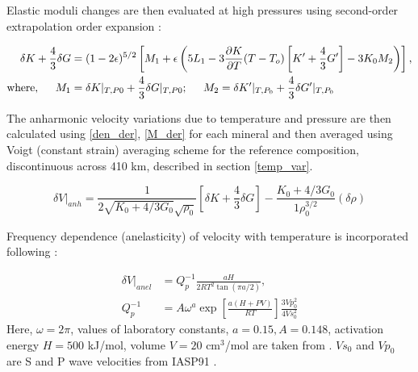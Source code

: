 \documentclass[draft,linenumbers]{agujournal2018}
\begin{document}
Elastic moduli changes are then evaluated at high pressures using second-order extrapolation order expansion \citep{duffy1989seismic}:

\begin{align} \label{M_der}
    \delta K + \frac{4}{3} \delta G &= ( 1 - 2 \epsilon)^{5/2} \left[ M_1 + \epsilon \left( 5 L_1 - 3 \frac{\partial K}{\partial T }  ( T - T_o ) \left[ K' + \frac{4}{3} G' \right] - 3K_0 M_2 \right)  \right], \\ 
    \text{where}, \hspace{0.5cm}
    M_1 &= \delta K\vert_{T, P0} + \frac{4}{3}\delta G\vert_{T, P0} ; \hspace{0.5cm}
    M_2 = \delta K'\vert_{T, P_0} + \frac{4}{3}\delta G'\vert_{T, P_0} \nonumber
\end{align}

The anharmonic velocity variations due to temperature and pressure are then calculated using \ref{den_der}, \ref{M_der} for each mineral and then averaged using Voigt (constant strain) averaging scheme for the reference composition, discontinuous across 410 km,  described in section \ref{temp_var}.

\begin{equation} \label{anh}
    \delta V \vert_{anh} = \frac{1}{2\sqrt{K_0 + 4/3 G_0} \sqrt{\rho_0}} \left[\delta K + \frac{4}{3} \delta G \right] - \frac{K_0 + 4/3 G_0}{1\rho_0^{3/2}} ( \delta \rho)
\end{equation} 

Frequency dependence (anelasticity) of velocity with temperature is incorporated following \citet{Goes_2000}:

\begin{align} \label{anel}
    \delta V \vert_{anel} &= Q_p^{-1} \frac{aH}{2 R T^2 \tan(\pi a/2)},\\
    Q_p^{-1} &= A \omega^{a} \exp \left[ \frac{a(H+PV)}{RT} \right] \frac{3Vp_{0}^{2}}{4Vs_{0}^{2}} \nonumber
\end{align}
Here, $\omega = 2\pi $, values of laboratory constants, $a = 0.15, A = 0.148$, activation energy $H = 500$ kJ/mol, volume $V = 20$ cm$^3$/mol are taken from \citet{sobolev1996upper}. $Vs_0$ and $Vp_0$ are S and P wave velocities from IASP91 \citep{kennett1991traveltimes}.
\end{document}
